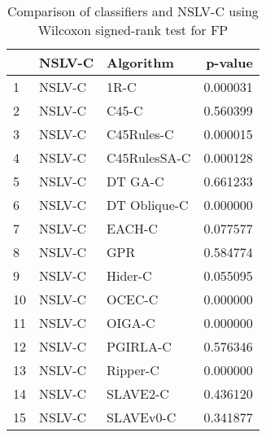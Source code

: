 \begin{table}
\footnotesize
\caption{Comparison of classifiers and NSLV-C using Wilcoxon signed-rank test for FP}
\label{tab:NSLV-C wilcoxon FP comparison}
\begin{tabular}{lllr}
\hline
 & NSLV-C & Algorithm & p-value \\
\hline
1 & NSLV-C & 1R-C & 0.000031 \\
2 & NSLV-C & C45-C & 0.560399 \\
3 & NSLV-C & C45Rules-C & 0.000015 \\
4 & NSLV-C & C45RulesSA-C & 0.000128 \\
5 & NSLV-C & DT GA-C & 0.661233 \\
6 & NSLV-C & DT Oblique-C & 0.000000 \\
7 & NSLV-C & EACH-C & 0.077577 \\
8 & NSLV-C & GPR & 0.584774 \\
9 & NSLV-C & Hider-C & 0.055095 \\
10 & NSLV-C & OCEC-C & 0.000000 \\
11 & NSLV-C & OIGA-C & 0.000000 \\
12 & NSLV-C & PGIRLA-C & 0.576346 \\
13 & NSLV-C & Ripper-C & 0.000000 \\
14 & NSLV-C & SLAVE2-C & 0.436120 \\
15 & NSLV-C & SLAVEv0-C & 0.341877 \\
\hline
\end{tabular}
\end{table}
